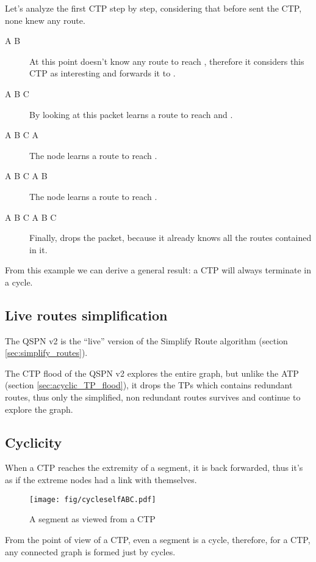 \documentclass[a4paper]{article}
\begin{document}
Let's analyze the first CTP step by step, considering that before  sent the
CTP, none knew any route.
\begin{description}
	\item[A  B] At this point  doesn't know any route to
		reach , therefore it considers this CTP as interesting and
		forwards it to .
	\item[A  B  C] By looking at this packet 
		learns a route to reach  and .
	\item[A  B  C  A] The node 
		learns a route to reach .
	\item[A  B  C  A 
		B] The node  learns a route to reach .
	\item[A  B  C  A 
		B  C] Finally,  drops the packet, because it
		already knows all the routes contained in it.
\end{description}

From this example we can derive a general result: a CTP will always terminate
in a cycle.

\subsection{Live routes simplification}
The QSPN v2 is the ``live'' version of the Simplify Route algorithm (section
\ref{sec:simplify_routes}).

The CTP flood of the QSPN v2 explores the entire graph, but unlike the ATP
(section \ref{sec:acyclic_TP_flood}), it drops the TPs which contains
redundant routes, thus only the simplified, non redundant routes survives and
continue to explore the graph.

\newpage
\subsection{Cyclicity}
\label{sec:CTP_ciclicity}
When a CTP reaches the extremity of a segment, it is back forwarded, thus it's
as if the extreme nodes had a link with themselves.

\begin{figure}[h]
	\begin{center}
		\texttt{[image: fig/cycleselfABC.pdf]}
	\end{center}
	\caption{A segment as viewed from a CTP}
	\label{fig:CTP_segment}
\end{figure}

From the point of view of a CTP, even a segment is a cycle, therefore, for a
CTP, any connected graph is formed just by cycles.
\end{document}
